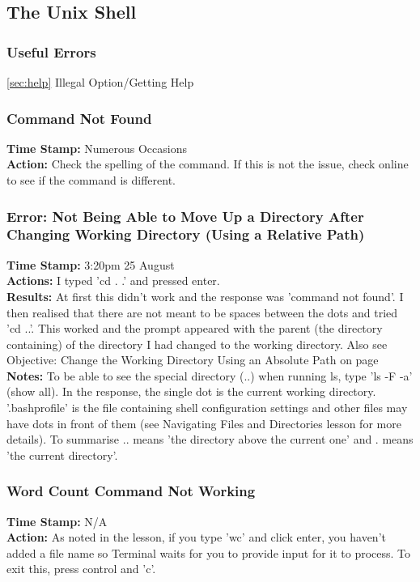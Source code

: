 \documentclass{article}
\begin{document}
\begin{FlushLeft}
\subsection{The Unix Shell}
\subsubsection{Useful Errors}
\autoref{sec:help} Illegal Option/Getting Help\\

\subsubsection{Command Not Found}
\textbf{Time Stamp:} Numerous Occasions\\
\textbf{Action:} Check the spelling of the command. If this is not the issue, check online to see if the command is different.\\

\subsubsection{Error: Not Being Able to Move Up a Directory After Changing Working Directory (Using a Relative Path)}
\textbf{Time Stamp:} 3:20pm 25 August\\
\textbf{Actions:} I typed 'cd . .' and pressed enter. \\
\textbf{Results:} At first this didn't work and the response was 'command not found'. I then realised that there are not meant to be spaces between the dots and tried 'cd ..'. This worked and the prompt appeared with the parent (the directory containing) of the directory I had changed to the working directory. Also see Objective: Change the Working Directory Using an Absolute Path on page \pageref{absolute}\\
\textbf{Notes:} To be able to see the special directory (..) when running ls, type 'ls -F -a' (show all). In the response, the single dot is the current working directory. '.bash\textunderscore profile' is the file containing shell configuration settings and other files may have dots in front of them (see Navigating Files and Directories lesson for more details). To summarise .. means 'the directory above the current one' and . means 'the current directory'.

\subsubsection{Word Count Command Not Working}
\textbf{Time Stamp:} N/A\\
\textbf{Action:} As noted in the lesson, if you type 'wc' and click enter, you haven't added a file name so Terminal waits for you to provide input for it to process. To exit this, press control and 'c'.\\

\end{FlushLeft}
\end{document}
